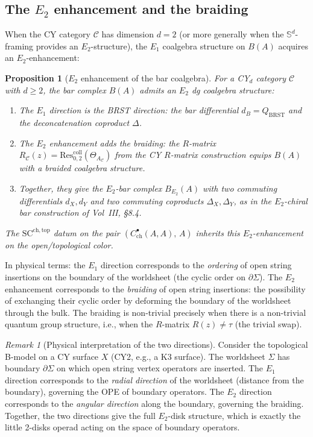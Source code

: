 \documentclass[11pt]{amsart}
\theoremstyle{plain}
\newtheorem{proposition}[theorem]{Proposition}
\theoremstyle{definition}
\theoremstyle{remark}
\newtheorem{remark}[theorem]{Remark}
\newcommand{\BRST}{\mathrm{BRST}}
\newcommand{\SC}{\mathrm{SC}}
\newcommand{\cC}{\mathcal{C}}
\begin{document}
\subsection{The $E_2$ enhancement and the braiding}
\label{subsec:e2-enhancement}

When the CY category $\cC$ has dimension $d = 2$ (or more generally when the $\mathbb{S}^d$-framing provides an $E_2$-structure), the $E_1$ coalgebra structure on $B(A)$ acquires an $E_2$-enhancement:

\begin{proposition}[$E_2$ enhancement of the bar coalgebra]
\label{prop:e2-sc}
For a CY$_d$ category $\cC$ with $d \geq 2$, the bar complex $B(A)$ admits an $E_2$ dg coalgebra structure:
\begin{enumerate}[label=(\roman*)]
 \item The $E_1$ direction is the BRST direction: the bar differential $d_B = Q_{\BRST}$ and the deconcatenation coproduct $\Delta$.
 \item The $E_2$ enhancement adds the braiding: the $R$-matrix $R_\cC(z) = \mathrm{Res}^{\mathrm{coll}}_{0,2}(\Theta_{A_\cC})$ from the CY $R$-matrix construction equips $B(A)$ with a braided coalgebra structure.
 \item Together, they give the $E_2$-bar complex $B_{E_2}(A)$ with two commuting differentials $d_X, d_Y$ and two commuting coproducts $\Delta_X, \Delta_Y$, as in the $E_2$-chiral bar construction of Vol~III, \S 8.4.
\end{enumerate}
The $\SC^{\mathrm{ch,top}}$ datum on the pair $(C^\bullet_{\mathrm{ch}}(A,A),\, A)$ inherits this $E_2$-enhancement on the open/topological color.
\end{proposition}

In physical terms: the $E_1$ direction corresponds to the \emph{ordering} of open string insertions on the boundary of the worldsheet (the cyclic order on $\partial\Sigma$). The $E_2$ enhancement corresponds to the \emph{braiding} of open string insertions: the possibility of exchanging their cyclic order by deforming the boundary of the worldsheet through the bulk. The braiding is non-trivial precisely when there is a non-trivial quantum group structure, i.e., when the $R$-matrix $R(z) \neq \tau$ (the trivial swap).

\begin{remark}[Physical interpretation of the two directions]
\label{rem:two-directions}
Consider the topological B-model on a CY surface $X$ (CY2, e.g., a K3 surface). The worldsheet $\Sigma$ has boundary $\partial\Sigma$ on which open string vertex operators are inserted. The $E_1$ direction corresponds to the \emph{radial direction} of the worldsheet (distance from the boundary), governing the OPE of boundary operators. The $E_2$ direction corresponds to the \emph{angular direction} along the boundary, governing the braiding. Together, the two directions give the full $E_2$-disk structure, which is exactly the little 2-disks operad acting on the space of boundary operators.
\end{remark}
\end{document}
